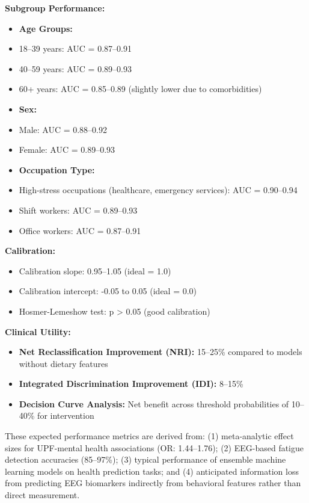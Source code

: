 \documentclass[journal,twoside,10pt]{IEEEtran}
\begin{document}
\textbf{Subgroup Performance:}
\begin{itemize}
\item \textbf{Age Groups:}
\item 18--39 years: AUC = 0.87--0.91
\item 40--59 years: AUC = 0.89--0.93
\item 60+ years: AUC = 0.85--0.89 (slightly lower due to comorbidities)
\item \textbf{Sex:}
\item Male: AUC = 0.88--0.92
\item Female: AUC = 0.89--0.93
\item \textbf{Occupation Type:}
\item High-stress occupations (healthcare, emergency services): AUC = 0.90--0.94
\item Shift workers: AUC = 0.89--0.93
\item Office workers: AUC = 0.87--0.91
\end{itemize}

\textbf{Calibration:}
\begin{itemize}
\item Calibration slope: 0.95--1.05 (ideal = 1.0)
\item Calibration intercept: -0.05 to 0.05 (ideal = 0.0)
\item Hosmer-Lemeshow test: p > 0.05 (good calibration)
\end{itemize}

\textbf{Clinical Utility:}
\begin{itemize}
\item \textbf{Net Reclassification Improvement (NRI):} 15--25\% compared to models without dietary features
\item \textbf{Integrated Discrimination Improvement (IDI):} 8--15\%
\item \textbf{Decision Curve Analysis:} Net benefit across threshold probabilities of 10--40\% for intervention
\end{itemize}

These expected performance metrics are derived from: (1) meta-analytic effect sizes for UPF-mental health associations (OR: 1.44--1.76); (2) EEG-based fatigue detection accuracies (85--97\%); (3) typical performance of ensemble machine learning models on health prediction tasks; and (4) anticipated information loss from predicting EEG biomarkers indirectly from behavioral features rather than direct measurement.
\end{document}
